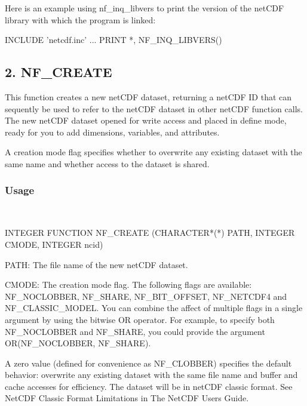 Here is an example using nf\+\_\+inq\+\_\+libvers to print the version of the net\+C\+DF library with which the program is linked\+:


\begin{DoxyCode}
INCLUDE 'netcdf.inc'
   ...
PRINT *, NF\_INQ\_LIBVERS()
\end{DoxyCode}
\hypertarget{nc_f77_interface_guide_f77_NF_CREATE}{}\subsection{2. N\+F\+\_\+\+C\+R\+E\+A\+T\+E }\label{nc_f77_interface_guide_f77_NF_CREATE}
This function creates a new net\+C\+DF dataset, returning a net\+C\+DF ID that can sequently be used to refer to the net\+C\+DF dataset in other net\+C\+DF function calls. The new net\+C\+DF dataset opened for write access and placed in define mode, ready for you to add dimensions, variables, and attributes.

A creation mode flag specifies whether to overwrite any existing dataset with the same name and whether access to the dataset is shared.

\subsubsection*{Usage}

  
\begin{DoxyCode}
INTEGER FUNCTION NF\_CREATE (CHARACTER*(*) PATH, INTEGER CMODE,
                            INTEGER ncid)
\end{DoxyCode}


{\ttfamily P\+A\+TH}\+: The file name of the new net\+C\+DF dataset.

{\ttfamily C\+M\+O\+DE}\+: The creation mode flag. The following flags are available\+: N\+F\+\_\+\+N\+O\+C\+L\+O\+B\+B\+ER, N\+F\+\_\+\+S\+H\+A\+RE, N\+F\+\_\+B\+I\+T\+\_\+\+O\+F\+F\+S\+ET, N\+F\+\_\+\+N\+E\+T\+C\+D\+F4 and N\+F\+\_\+\+C\+L\+A\+S\+S\+I\+C\+\_\+\+M\+O\+D\+EL. You can combine the affect of multiple flags in a single argument by using the bitwise OR operator. For example, to specify both N\+F\+\_\+\+N\+O\+C\+L\+O\+B\+B\+ER and N\+F\+\_\+\+S\+H\+A\+RE, you could provide the argument O\+R(\+N\+F\+\_\+\+N\+O\+C\+L\+O\+B\+B\+E\+R, N\+F\+\_\+\+S\+H\+A\+R\+E).

A zero value (defined for convenience as N\+F\+\_\+\+C\+L\+O\+B\+B\+ER) specifies the default behavior\+: overwrite any existing dataset with the same file name and buffer and cache accesses for efficiency. The dataset will be in net\+C\+DF classic format. See \textquotesingle{}Net\+C\+DF Classic Format Limitations\textquotesingle{} in The Net\+C\+DF Users Guide.

